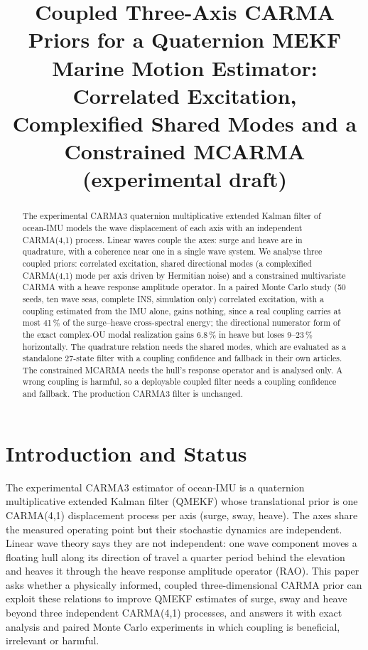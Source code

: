 \documentclass[conference]{IEEEtran}
\title{Coupled Three-Axis CARMA Priors for a Quaternion MEKF Marine
Motion Estimator: Correlated Excitation, Complexified Shared Modes and a
Constrained MCARMA (experimental draft)}
\author{%
  \IEEEauthorblockN{Mikhail S. Grushinskiy}
  \IEEEauthorblockA{Independent Researcher, USA, Fair Lawn\\
  Bareboat Necessities GitHub Project\\
  Email: mgrouch@users.github.com}%
}
\theoremstyle{bodysmall}
\begin{document}
\maketitle

\begin{abstract}
The experimental CARMA3 quaternion multiplicative extended Kalman filter of
ocean-IMU models the wave displacement of each axis with an independent
CARMA(4,1) process. Linear waves couple the axes: surge and heave are in
quadrature, with a coherence near one in a single wave system. We analyse
three coupled priors: correlated excitation, shared directional modes (a
complexified CARMA(4,1) mode per axis driven by Hermitian noise) and a
constrained multivariate CARMA with a heave response amplitude operator. In
a paired Monte Carlo study (50 seeds, ten wave seas, complete INS,
simulation only) correlated excitation, with a coupling estimated from the
IMU alone, gains nothing, since a real coupling carries at most 41\,\% of
the surge--heave cross-spectral energy; the directional numerator form of
the exact complex-OU modal realization gains 6.8\,\% in heave but loses
9--23\,\% horizontally. The quadrature relation needs the shared modes,
which are evaluated as a standalone 27-state filter with a coupling
confidence and fallback in their own articles. The constrained MCARMA needs
the hull's response operator and is analysed only. A wrong coupling is
harmful, so a deployable coupled filter needs a coupling confidence and
fallback. The production CARMA3 filter is unchanged.
\end{abstract}

\section{Introduction and Status}
The experimental CARMA3 estimator of ocean-IMU is a quaternion
multiplicative extended Kalman filter (QMEKF) whose translational prior is one
CARMA(4,1) displacement process per axis (surge, sway, heave). The axes share
the measured operating point but their stochastic dynamics are independent.
Linear wave theory says they are not independent: one wave component moves a
floating hull along its direction of travel a quarter period behind the
elevation and heaves it through the heave response amplitude operator (RAO).
This paper asks whether a physically informed, coupled three-dimensional
CARMA prior can exploit these relations to improve QMEKF estimates of surge,
sway and heave beyond three independent CARMA(4,1) processes, and answers it
with exact analysis and paired Monte Carlo experiments in which coupling is
beneficial, irrelevant or harmful.
\end{document}
